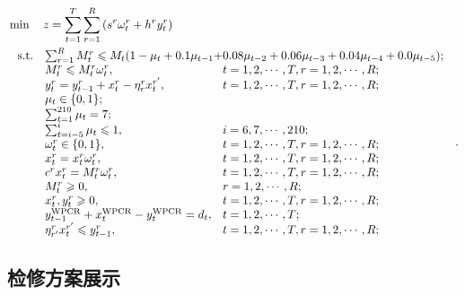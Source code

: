 \begin{equation}\label{三模型}
	\begin{aligned}
&\min \quad z  = \sum_{t  = 1}^{T} \sum_{r = 1}^{R}\left(s^{r} \omega_{t}^{r}+h^{r} y_{t}^{r}\right)\\
& \ \begin{array}{r@{\quad}l@{}l@{\quad}l}
\mathrm{s.t. }
&	\sum_{r=1}^{R} M_{t}^{r} \leqslant M_{t}(1-\mu_{t}+0.1 \mu_{t-1}+&0.08 \mu_{t-2}+0.06 \mu_{t-3}+0.04 \mu_{t-4}+0.0 \mu_{t-5});\\
&M_{t}^{r} \leqslant M_{t}^{r} \omega_{t}^{r}, &t=1,2, \cdots, T, r=1,2, \cdots, R;\\
& y_{t}^{r}=y_{t-1}^{r}+x_{t}^{r}-\eta_{r}^{r} x_{t}^{r^{\prime}}, &t=1,2, \cdots, T,  r=1,2, \cdots, R; \\
&\mu_{t} \in\{0,1\};&\\
&\sum_{t=1}^{210}\mu_t=7;&\\
&\sum_{t=i-5}^{i} \mu_{t} \leqslant 1,& i=6,7, \cdots, 210;\\

&\omega_{t}^{r} \in\{0,1\}, &t=1,2, \cdots, T, r=1,2, \cdots, R; \\
&x_{t}^{r}=x_{t}^{r} \omega_{t}^{r},&t=1,2, \cdots, T, r=1,2, \cdots, R;\\
&c^{r} x_{t}^{r}=M_{t}^{r} \omega_{t}^{r}, &t=1,2, \cdots, T, r=1,2, \cdots, R; \\
&M_{t}^{r} \geqslant 0,& r=1,2, \cdots, R ;\\
&x_{t}^{r}, y_{t}^{r} \geqslant 0, &t=1,2, \cdots, T, r=1,2, \cdots, R;\\
&y_{t-1}^{\mathrm{WPCR}}+x_{t}^{\mathrm{WPCR}}-y_{t}^{\mathrm{WPCR}}=d_{t}, & t=1,2, \cdots, T; \\
&\eta_{r^{\prime}}^{r} x_{t}^{r^{\prime}} \leqslant y_{t-1}^{r}, &t=1,2, \cdots, T, r=1,2, \cdots, R;
\end{array}.
\end{aligned}
\end{equation}

\subsection{检修方案展示} %
\label{sub:检修方案展示}


